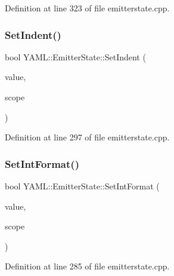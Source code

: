 Definition at line 323 of file emitterstate.\+cpp.

\mbox{\label{class_y_a_m_l_1_1_emitter_state_abf3b260c8f784b77ee6405d1dbcba85c}} 
\subsubsection{\texorpdfstring{SetIndent()}{SetIndent()}}
{\footnotesize\ttfamily bool Y\+A\+M\+L\+::\+Emitter\+State\+::\+Set\+Indent (\begin{DoxyParamCaption}\item[{std\+::size\+\_\+t}]{value,  }\item[{\mbox{\hyperlink{struct_y_a_m_l_1_1_fmt_scope_a58c967eadfafdc79f62cd5c59ec2b1fe}{Fmt\+Scope\+::value}}}]{scope }\end{DoxyParamCaption})}



Definition at line 297 of file emitterstate.\+cpp.

\mbox{\label{class_y_a_m_l_1_1_emitter_state_a00e09382a29d3eaaec8f667973002eea}} 
\subsubsection{\texorpdfstring{SetIntFormat()}{SetIntFormat()}}
{\footnotesize\ttfamily bool Y\+A\+M\+L\+::\+Emitter\+State\+::\+Set\+Int\+Format (\begin{DoxyParamCaption}\item[{\mbox{\hyperlink{namespace_y_a_m_l_a67c320aa50d3de7ecba1d0b8775dd684}{E\+M\+I\+T\+T\+E\+R\+\_\+\+M\+A\+N\+IP}}}]{value,  }\item[{\mbox{\hyperlink{struct_y_a_m_l_1_1_fmt_scope_a58c967eadfafdc79f62cd5c59ec2b1fe}{Fmt\+Scope\+::value}}}]{scope }\end{DoxyParamCaption})}



Definition at line 285 of file emitterstate.\+cpp.

\mbox{\label{class_y_a_m_l_1_1_emitter_state_aaf4b807f7c6f37f3747748dd15a2f62d}} 
